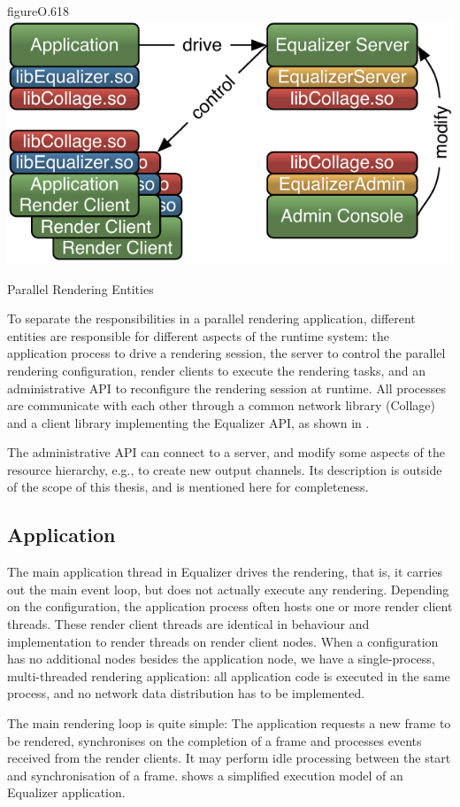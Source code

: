 \begin{wrapfloat}{figure}{O}{.618\textwidth}
 \includegraphics[width=.618\textwidth]{images/processes}
 {\caption{\label{fProcessing}Parallel Rendering Entities}}
\end{wrapfloat}

To separate the responsibilities in a parallel rendering application, different
entities are responsible for different aspects of the runtime system: the
application process to drive a rendering session, the server to control the
parallel rendering configuration, render clients to execute the rendering
tasks, and an administrative API to reconfigure the rendering session at
runtime. All processes are communicate with each other through a common network
library (Collage) and a client library implementing the Equalizer API, as shown
in .

The administrative API can connect to a server, and modify some aspects of the
resource hierarchy, e.g., to create new output channels. Its description is
outside of the scope of this thesis, and is mentioned here for
completeness.

\subsection{Application}

The main application thread in Equalizer drives the rendering, that is, it
carries out the main event loop, but does not actually execute any rendering.
Depending on the configuration, the application process often hosts one or more
render client threads. These render client threads are identical in behaviour
and implementation to render threads on render client nodes. When a
configuration has no additional nodes besides the application node, we have a
single-process, multi-threaded rendering application: all application code is
executed in the same process, and no network data distribution has to be
implemented.

The main rendering loop is quite simple: The application requests a new frame
to be rendered, synchronises on the completion of a frame and processes events
received from the render clients. It may perform idle processing between the
start and synchronisation of a frame.  shows a simplified
execution model of an Equalizer application.


